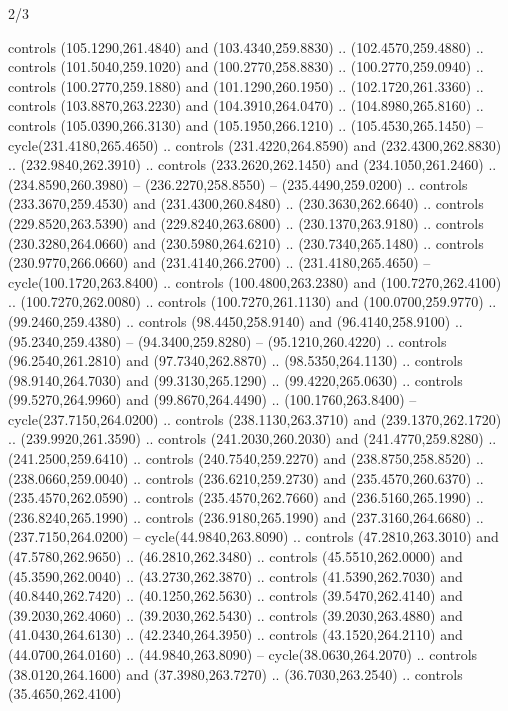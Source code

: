 \begin{flagdescription}{2/3}
\begin{scope}[xshift=0.5\flaglength,yshift=0.5\flagwidth,scale=\stretchfactor]
\begin{scope}[scale=0.001645\flagwidth,yshift=65mm,xshift=-63mm]
\begin{scope}[y=0.80pt, x=0.80pt, yscale=-1,]
\begin{scope}[cm={{1.33333,0.0,0.0,1.33333,(0.0,1e-05)}}]
  controls (105.1290,261.4840) and (103.4340,259.8830) .. (102.4570,259.4880) ..
  controls (101.5040,259.1020) and (100.2770,258.8830) .. (100.2770,259.0940) ..
  controls (100.2770,259.1880) and (101.1290,260.1950) .. (102.1720,261.3360) ..
  controls (103.8870,263.2230) and (104.3910,264.0470) .. (104.8980,265.8160) ..
  controls (105.0390,266.3130) and (105.1950,266.1210) .. (105.4530,265.1450) --
  cycle(231.4180,265.4650) .. controls (231.4220,264.8590) and
  (232.4300,262.8830) .. (232.9840,262.3910) .. controls (233.2620,262.1450) and
  (234.1050,261.2460) .. (234.8590,260.3980) -- (236.2270,258.8550) --
  (235.4490,259.0200) .. controls (233.3670,259.4530) and (231.4300,260.8480) ..
  (230.3630,262.6640) .. controls (229.8520,263.5390) and (229.8240,263.6800) ..
  (230.1370,263.9180) .. controls (230.3280,264.0660) and (230.5980,264.6210) ..
  (230.7340,265.1480) .. controls (230.9770,266.0660) and (231.4140,266.2700) ..
  (231.4180,265.4650) -- cycle(100.1720,263.8400) .. controls
  (100.4800,263.2380) and (100.7270,262.4100) .. (100.7270,262.0080) .. controls
  (100.7270,261.1130) and (100.0700,259.9770) .. (99.2460,259.4380) .. controls
  (98.4450,258.9140) and (96.4140,258.9100) .. (95.2340,259.4380) --
  (94.3400,259.8280) -- (95.1210,260.4220) .. controls (96.2540,261.2810) and
  (97.7340,262.8870) .. (98.5350,264.1130) .. controls (98.9140,264.7030) and
  (99.3130,265.1290) .. (99.4220,265.0630) .. controls (99.5270,264.9960) and
  (99.8670,264.4490) .. (100.1760,263.8400) -- cycle(237.7150,264.0200) ..
  controls (238.1130,263.3710) and (239.1370,262.1720) .. (239.9920,261.3590) ..
  controls (241.2030,260.2030) and (241.4770,259.8280) .. (241.2500,259.6410) ..
  controls (240.7540,259.2270) and (238.8750,258.8520) .. (238.0660,259.0040) ..
  controls (236.6210,259.2730) and (235.4570,260.6370) .. (235.4570,262.0590) ..
  controls (235.4570,262.7660) and (236.5160,265.1990) .. (236.8240,265.1990) ..
  controls (236.9180,265.1990) and (237.3160,264.6680) .. (237.7150,264.0200) --
  cycle(44.9840,263.8090) .. controls (47.2810,263.3010) and (47.5780,262.9650)
  .. (46.2810,262.3480) .. controls (45.5510,262.0000) and (45.3590,262.0040) ..
  (43.2730,262.3870) .. controls (41.5390,262.7030) and (40.8440,262.7420) ..
  (40.1250,262.5630) .. controls (39.5470,262.4140) and (39.2030,262.4060) ..
  (39.2030,262.5430) .. controls (39.2030,263.4880) and (41.0430,264.6130) ..
  (42.2340,264.3950) .. controls (43.1520,264.2110) and (44.0700,264.0160) ..
  (44.9840,263.8090) -- cycle(38.0630,264.2070) .. controls (38.0120,264.1600)
  and (37.3980,263.7270) .. (36.7030,263.2540) .. controls (35.4650,262.4100)

\end{scope}
\end{scope}
\end{scope}
\end{scope}
\end{flagdescription}
